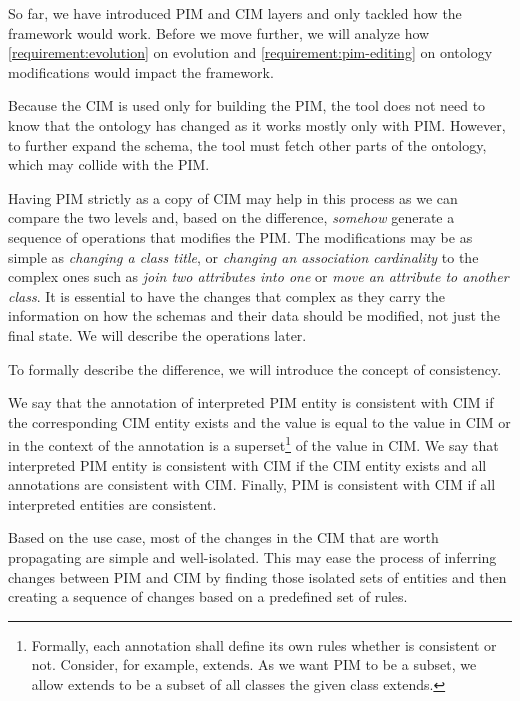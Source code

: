 So far, we have introduced PIM and CIM layers and only tackled how the framework would work. Before we move further, we will analyze how \autoref{requirement:evolution} on evolution and \ref{requirement:pim-editing} on ontology modifications would impact the framework.

Because the CIM is used only for building the PIM, the tool does not need to know that the ontology has changed as it works mostly only with PIM. However, to further expand the schema, the tool must fetch other parts of the ontology, which may collide with the PIM.

Having PIM strictly as a copy of CIM may help in this process as we can compare the two levels and, based on the difference, \textit{somehow} generate a sequence of operations that modifies the PIM. The modifications may be as simple as \textit{changing a class title}, or \textit{changing an association cardinality} to the complex ones such as \textit{join two attributes into one} or \textit{move an attribute to another class}. It is essential to have the changes that complex as they carry the information on how the schemas and their data should be modified, not just the final state. We will describe the operations later.

To formally describe the difference, we will introduce the concept of consistency.

\begin{definition}[consistency]
    We say that the annotation of interpreted PIM entity is consistent with CIM if the corresponding CIM entity exists and the value is equal to the value in CIM or in the context of the annotation is a superset\footnote{Formally, each annotation shall define its own rules whether is consistent or not. Consider, for example, $\textrm{extends}$. As we want PIM to be a subset, we allow $\textrm{extends}$ to be a subset of all classes the given class extends.} of the value in CIM. We say that {interpreted PIM entity is consistent with CIM} if the CIM entity exists and all annotations are consistent with CIM. Finally, {PIM is consistent with CIM} if all interpreted entities are consistent.
\end{definition}

Based on the use case, most of the changes in the CIM that are worth propagating are simple and well-isolated. This may ease the process of inferring changes between PIM and CIM by finding those isolated sets of entities and then creating a sequence of changes based on a predefined set of rules.


